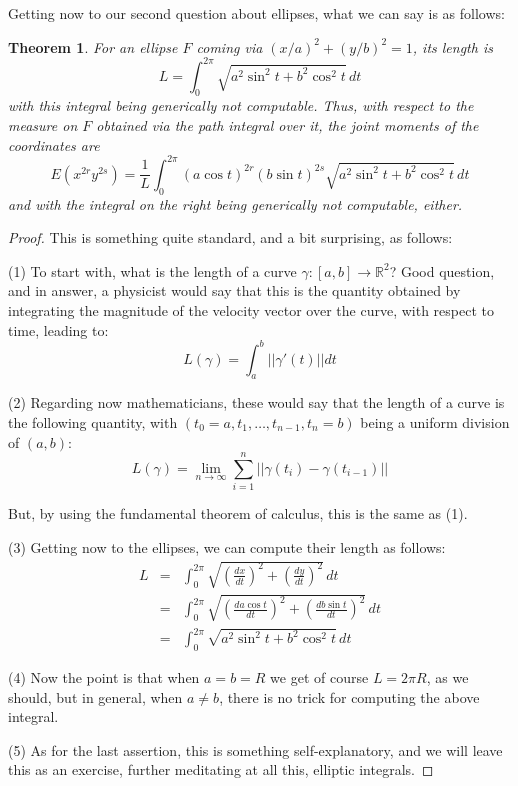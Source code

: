 \documentclass[12pt]{amsbook}
\newtheorem{theorem}{Theorem}[chapter]
\begin{document}
Getting now to our second question about ellipses, what we can say is as follows:


\begin{theorem}
For an ellipse $F$ coming via $(x/a)^2+(y/b)^2=1$, its length is
$$L=\int_0^{2\pi}\sqrt{a^2\sin^2t+b^2\cos^2t}\,dt$$
with this integral being generically not computable. Thus, with respect to the measure on $F$ obtained via the path integral over it, the joint moments of the coordinates are
$$E(x^{2r}y^{2s})=\frac{1}{L}\int_0^{2\pi}(a\cos t)^{2r}(b\sin t)^{2s}\sqrt{a^2\sin^2t+b^2\cos^2t}\,dt$$
and with the integral on the right being generically not computable, either.
\end{theorem}

\begin{proof}
This is something quite standard, and a bit surprising, as follows:

\medskip

(1) To start with, what is the length of a curve $\gamma:[a,b]\to\mathbb R^2$? Good question, and in answer, a physicist would say that this is the quantity obtained by integrating the magnitude of the velocity vector over the curve, with respect to time, leading to:
$$L(\gamma)=\int_a^b||\gamma'(t)||dt$$

(2) Regarding now mathematicians, these would say that the length of a curve is the following quantity, with $(t_0=a,t_1,\ldots,t_{n-1},t_n=b)$ being a uniform division of $(a,b)$:
$$L(\gamma)=\lim_{n\to\infty}\sum_{i=1}^n||\gamma(t_i)-\gamma(t_{i-1})||$$

But, by using the fundamental theorem of calculus, this is the same as (1).

\medskip

(3) Getting now to the ellipses, we can compute their length as follows:
\begin{eqnarray*}
L
&=&\int_0^{2\pi}\sqrt{\left(\frac{dx}{dt}\right)^2+\left(\frac{dy}{dt}\right)^2}\,dt\\
&=&\int_0^{2\pi}\sqrt{\left(\frac{da\cos t}{dt}\right)^2+\left(\frac{db\sin t}{dt}\right)^2}\,dt\\
&=&\int_0^{2\pi}\sqrt{a^2\sin^2t+b^2\cos^2t}\,dt
\end{eqnarray*}

(4) Now the point is that when $a=b=R$ we get of course $L=2\pi R$, as we should, but in general, when $a\neq b$, there is no trick for computing the above integral.

\medskip

(5) As for the last assertion, this is something self-explanatory, and we will leave this as an exercise, further meditating at all this, elliptic integrals.
\end{proof}
\end{document}
